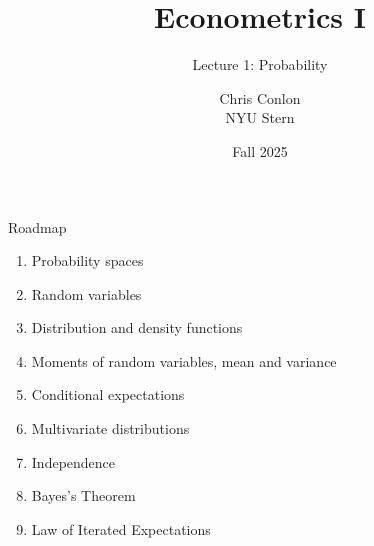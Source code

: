 




\title{Econometrics I}
\subtitle{Lecture 1: Probability}

\author{Chris Conlon \\NYU Stern}
\date{Fall 2025}
\maketitle


\begin{frame}{Roadmap}
\begin{enumerate}
	\item Probability spaces
	\item Random variables
	\item Distribution and density functions
	\item Moments of random variables, mean and variance
	\item Conditional expectations
	\item Multivariate distributions
	\item Independence
	\item Bayes's Theorem
	\item Law of Iterated Expectations
\end{enumerate}
\end{frame}



